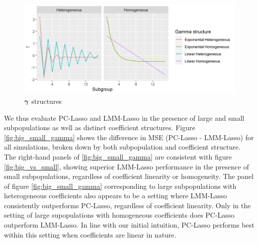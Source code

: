 
\begin{figure}[H]
    \centering
    \includegraphics[scale = 0.9]{figures/gamma_structure.png}
    \caption{$\boldsymbol{\gamma}$ structures}
    \label{fig:gamma_structures}
\end{figure}

We thus evaluate PC-Lasso and LMM-Lasso in the presence of large and small subpopulations as well as distinct coefficient structures. Figure \ref{fig:big_small_gamma} shows the difference in MSE (PC-Lasso - LMM-Lasso) for all simulations, broken down by both subpopulation and coefficient structure. The right-hand panels of \ref{fig:big_small_gamma} are consistent with figure \ref{fig:big_vs_small}, showing superior LMM-Lasso performance in the presence of small subpopulations, regardless of coefficient linearity or homogeneity. The panel of figure \ref{fig:big_small_gamma} corresponding to large subpopulations with heterogeneous coefficients also appears to be a setting where LMM-Lasso consistently outperforms PC-Lasso, regardless of coefficient linearity. Only in the setting of large supopulations with homogeneous coefficients does PC-Lasso outperform LMM-Lasso. In line with our initial intuition, PC-Lasso performs best within this setting when coefficients are linear in nature. 

